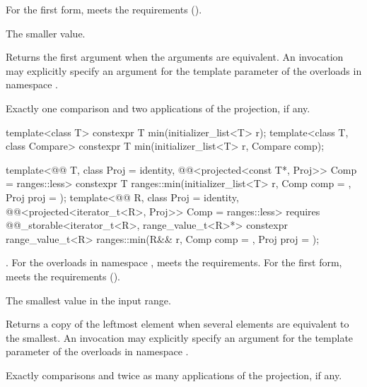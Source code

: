 \begin{itemdescr}
\pnum
\expects
For the first form,  meets the
 requirements ().

\pnum
\returns
The smaller value.

\pnum
\remarks
Returns the first argument when the arguments are equivalent.
An invocation may explicitly specify
an argument for the template parameter 
of the overloads in namespace .

\pnum
\complexity
Exactly one comparison and two applications of the projection, if any.
\end{itemdescr}

%
\begin{itemdecl}
template<class T>
  constexpr T min(initializer_list<T> r);
template<class T, class Compare>
  constexpr T min(initializer_list<T> r, Compare comp);

template<@@ T, class Proj = identity,
         @@<projected<const T*, Proj>> Comp = ranges::less>
  constexpr T ranges::min(initializer_list<T> r, Comp comp = {}, Proj proj = {});
template<@@ R, class Proj = identity,
         @@<projected<iterator_t<R>, Proj>> Comp = ranges::less>
  requires @@_storable<iterator_t<R>, range_value_t<R>*>
  constexpr range_value_t<R>
    ranges::min(R&& r, Comp comp = {}, Proj proj = {});
\end{itemdecl}

\begin{itemdescr}
\pnum
\expects
{}.
For the overloads in namespace ,
 meets the  requirements.
For the first form,  meets the 
requirements ().

\pnum
\returns
The smallest value in the input range.

\pnum
\remarks
Returns a copy of the leftmost element
when several elements are equivalent to the smallest.
An invocation may explicitly specify
an argument for the template parameter 
of the overloads in namespace .

\pnum
\complexity
Exactly  comparisons
and twice as many applications of the projection, if any.
\end{itemdescr}

